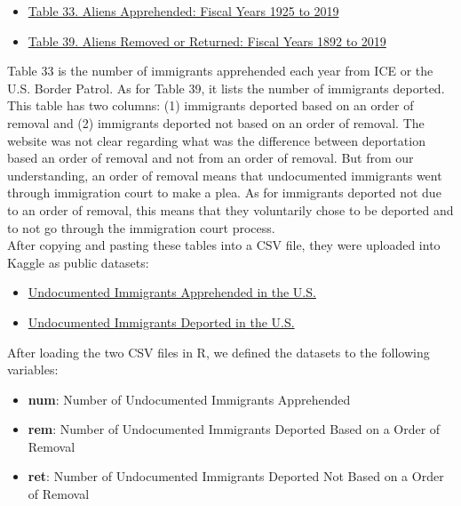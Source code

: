 \documentclass[a4paper]{article}
\begin{document}
\begin{itemize}
  \item \href{https://www.dhs.gov/immigration-statistics/yearbook/2019/table33}{Table 33. Aliens Apprehended: Fiscal Years 1925 to 2019}
  \item \href{https://www.dhs.gov/immigration-statistics/yearbook/2019/table39}{Table 39. Aliens Removed or Returned: Fiscal Years 1892 to 2019}
\end{itemize}

Table 33 is the number of immigrants apprehended each year from ICE or the U.S. Border Patrol. As for Table 39, it lists the number of immigrants deported. This table has two columns: (1) immigrants deported based on an order of removal and (2) immigrants deported not based on an order of removal. The website was not clear regarding what was the difference between deportation based an order of removal and not from an order of removal. But from our understanding, an order of removal means that  undocumented immigrants went through immigration court to make a plea. As for immigrants deported not due to an order of removal, this means that they voluntarily chose to be deported and to not go through the immigration court process. \\

After copying and pasting these tables into a CSV file, they were uploaded into Kaggle as public datasets:

\begin{itemize}
    \item \href{https://www.kaggle.com/ekayfabio/immigration-apprehended}{Undocumented Immigrants Apprehended in the U.S.}
    \item \href{https://www.kaggle.com/ekayfabio/immigration-deported}{Undocumented Immigrants Deported in the U.S.}
\end{itemize}

After loading the two CSV files in R, we defined the datasets to the following variables:

\begin{itemize}
    \item \textbf{num}: Number of Undocumented Immigrants Apprehended
    \item \textbf{rem}: Number of Undocumented Immigrants Deported Based on a Order of Removal
    \item \textbf{ret}: Number of Undocumented Immigrants Deported Not Based on a Order of Removal
\end{itemize}
\end{document}
